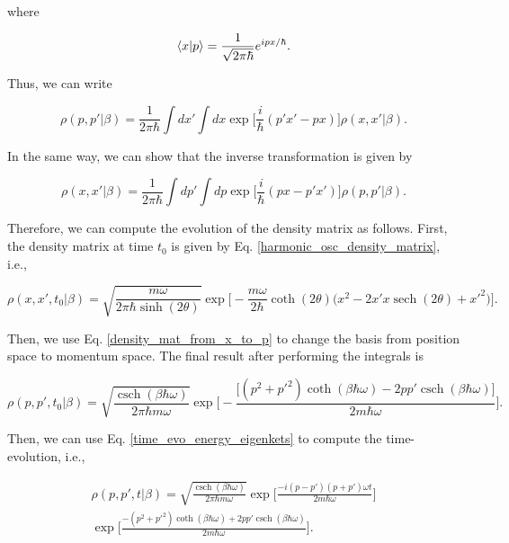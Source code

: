 \documentclass{article}
\DeclareMathOperator{\sech}{sech}
\DeclareMathOperator{\csch}{csch}
\begin{document}
where

\begin{equation}
    \braket{x|p} = \frac{1}{\sqrt{2\pi \hbar}} e^{i px/\hbar}.
\end{equation}

Thus, we can write

\begin{equation}\label{density_mat_from_x_to_p}
    \rho(p,p'|\beta) = \frac{1}{2\pi \hbar} \int dx' \int dx \exp \bigg[ \frac{i}{\hbar} (p'x'-px) \bigg] \rho(x,x'|\beta).
\end{equation}

In the same way, we can show that the inverse transformation is given by

\begin{equation}\label{density_mat_from_p_to_x}
    \rho(x,x'|\beta) = \frac{1}{2\pi \hbar} \int dp' \int dp \exp \bigg[ \frac{i}{\hbar} (px-p'x') \bigg] \rho(p,p'|\beta).
\end{equation}

Therefore, we can compute the evolution of the density matrix as follows. First, the density matrix at time $t_{0}$ is given by Eq. \ref{harmonic_osc_density_matrix}, i.e.,

\begin{equation}
    \rho(x, x', t_{0}|\beta) = \sqrt{\frac{m\omega}{2\pi \hbar \sinh(2\theta)}} \exp \Bigg[ - \frac{m\omega}{2\hbar} \coth(2\theta) \big( x^{2} - 2x' x \sech(2\theta) + x'^{2} \big) \Big].
\end{equation}

Then, we use Eq. \ref{density_mat_from_x_to_p} to change the basis from position space to momentum space. The final result after performing the integrals is

\begin{equation}\label{harmonic_osc_density_mat_momentum_base}
    \rho(p, p', t_{0}|\beta) = \sqrt{\frac{\csch(\beta \hbar \omega)}{2\pi \hbar m \omega}} \exp \bigg[ -\frac{\big[ (p^{2}+p'^{2})\coth(\beta \hbar \omega) - 2pp'\csch(\beta \hbar \omega) \big]}{2m\hbar \omega} \bigg].
\end{equation}

Then, we can use Eq. \ref{time_evo_energy_eigenkets} to compute the time-evolution, i.e.,

\begin{multline}
    \rho(p, p', t|\beta) = \sqrt{\frac{\csch(\beta \hbar \omega)}{2\pi \hbar m \omega}} \exp \bigg[ \frac{-i(p-p')(p+p')\omega t}{2m\hbar \omega} \bigg] \\ \exp \bigg[ \frac{ -(p^{2}+p'^{2})\coth(\beta \hbar \omega) + 2pp'\csch(\beta \hbar \omega) }{2m \hbar \omega} \bigg].
\end{multline}
\end{document}
